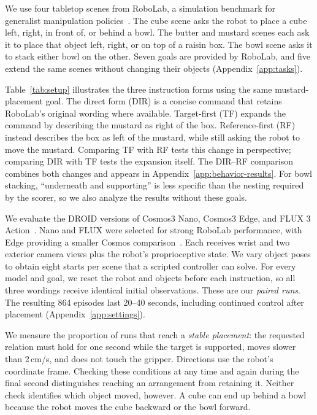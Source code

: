 \documentclass{article}
\begin{document}
\begin{samepage}
We use four tabletop scenes from RoboLab, a simulation benchmark for generalist manipulation policies~\citep{yang2026robolab}. The cube scene asks the robot to place a cube left, right, in front of, or behind a bowl. The butter and mustard scenes each ask it to place that object left, right, or on top of a raisin box. The bowl scene asks it to stack either bowl on the other. Seven goals are provided by RoboLab, and five extend the same scenes without changing their objects (Appendix~\ref{app:tasks}).
\par
\end{samepage}

Table~\ref{tab:setup} illustrates the three instruction forms using the same mustard-placement goal. The direct form (DIR) is a concise command that retains RoboLab's original wording where available. Target-first (TF) expands the command by describing the mustard as right of the box. Reference-first (RF) instead describes the box as left of the mustard, while still asking the robot to move the mustard. Comparing TF with RF tests this change in perspective; comparing DIR with TF tests the expansion itself. The DIR--RF comparison combines both changes and appears in Appendix~\ref{app:behavior-results}. For bowl stacking, ``underneath and supporting'' is less specific than the nesting required by the scorer, so we also analyze the results without these goals.

We evaluate the DROID versions of Cosmos3 Nano, Cosmos3 Edge, and FLUX 3 Action~\citep{nvidia2026nano,nvidia2026edge,bfl2026fluxaction}. Nano and FLUX were selected for strong RoboLab performance, with Edge providing a smaller Cosmos comparison~\citep{robolab2026leaderboard}. Each receives wrist and two exterior camera views plus the robot's proprioceptive state. We vary object poses to obtain eight starts per scene that a scripted controller can solve. For every model and goal, we reset the robot and objects before each instruction, so all three wordings receive identical initial observations. These are our \emph{paired runs}. The resulting 864 episodes last 20--40 seconds, including continued control after placement (Appendix~\ref{app:settings}).

We measure the proportion of runs that reach a \emph{stable placement}: the requested relation must hold for one second while the target is supported, moves slower than 2\,cm/s, and does not touch the gripper. Directions use the robot's coordinate frame. Checking these conditions at any time and again during the final second distinguishes reaching an arrangement from retaining it. Neither check identifies which object moved, however. A cube can end up behind a bowl because the robot moves the cube backward or the bowl forward.
\end{document}
